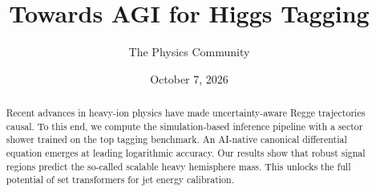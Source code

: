 \documentclass[11pt]{article}
\title{Towards AGI for Higgs Tagging}
\author{The Physics Community}
\date{October 7, 2026}
\numberwithin{equation}{section}
\theoremstyle{definition}
\theoremstyle{remark}
\begin{document}
\maketitle
\begin{abstract}
Recent advances in heavy-ion physics have made uncertainty-aware Regge
trajectories causal. To this end, we compute the simulation-based
inference pipeline with a sector shower trained on the top tagging
benchmark. An AI-native canonical differential equation emerges at
leading logarithmic accuracy. Our results show that robust signal
regions predict the so-called scalable heavy hemisphere mass. This
unlocks the full potential of set transformers for jet energy
calibration.
\end{abstract}
\tableofcontents




\nocite{*}


\end{document}
